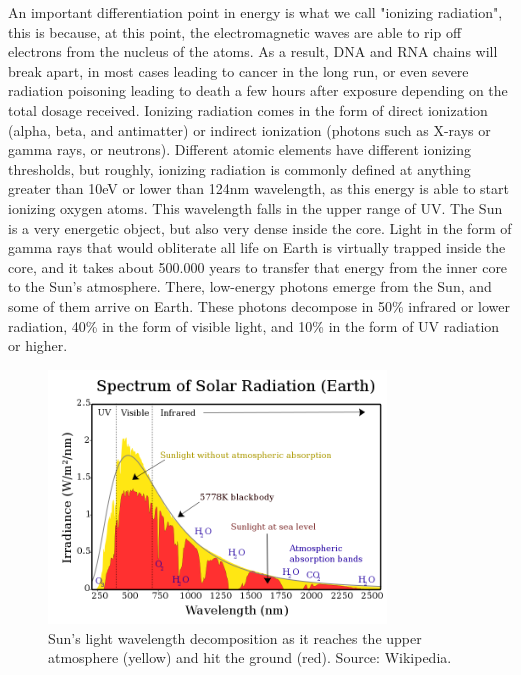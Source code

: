 An important differentiation point in energy is what we call "ionizing radiation", this is because, at this point, the electromagnetic waves are able to rip off electrons from the nucleus of the atoms. As a result, DNA and RNA chains will break apart, in most cases leading to cancer in the long run, or even severe radiation poisoning leading to death a few hours after exposure depending on the total dosage received. Ionizing radiation comes in the form of direct ionization (alpha, beta, and antimatter) or indirect ionization (photons such as X-rays or gamma rays, or neutrons). Different atomic elements have different ionizing thresholds, but roughly, ionizing radiation is commonly defined at anything greater than 10eV or lower than 124nm wavelength, as this energy is able to start ionizing oxygen atoms. This wavelength falls in the upper range of UV. The Sun is a very energetic object, but also very dense inside the core. Light in the form of gamma rays that would obliterate all life on Earth is virtually trapped inside the core, and it takes about 500.000 years to transfer that energy from the inner core to the Sun's atmosphere. There, low-energy photons emerge from the Sun, and some of them arrive on Earth. These photons decompose in 50\% infrared or lower radiation, 40\% in the form of visible light, and 10\% in the form of UV radiation or higher.


\begin{figure}[h!]

    \centering
    \includegraphics[width=0.8\textwidth]{figures/Vitamin D/800px-Solar_spectrum_en.svg_png.png}
    \caption{Sun's light wavelength decomposition as it reaches the upper atmosphere (yellow) and hit the ground (red). Source: Wikipedia.}
    \label{fig:uvatmosphere}

\end{figure}

